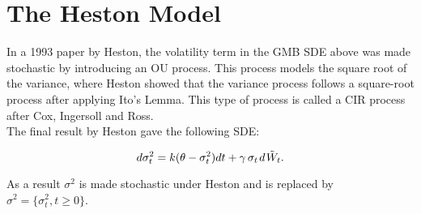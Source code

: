 
\section{The Heston Model}

In a 1993 paper by Heston, the volatility term in the GMB SDE above was made stochastic by introducing an OU process. This process models the square root of the variance, where Heston showed that the variance process follows a square-root process after applying Ito's Lemma. This type of process is called a CIR process after Cox, Ingersoll and Ross.\\

The final result by Heston gave the following SDE:

$$ d\sigma_t^2 = k(\theta - \sigma^2_t) dt + \gamma\,\sigma_t\hspace{0.1em} d \hspace{0.1em} \tilde{W}_t.$$

As a result $\sigma^2$ is made stochastic under Heston and is replaced by $\sigma^2 = \{\sigma_{t}^2,t\geq0\}$.